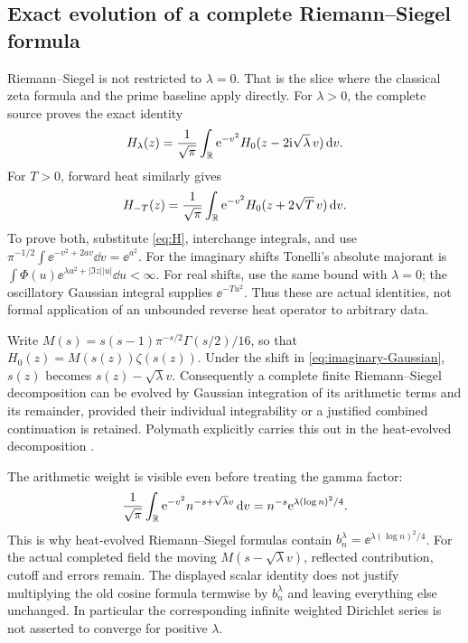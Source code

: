 \subsection{Exact evolution of a complete Riemann--Siegel formula}
Riemann--Siegel is not restricted to \(\lambda=0\). That is the slice
where the classical zeta formula and the prime baseline apply directly.
For \(\lambda>0\), the complete source proves the exact identity
\begin{equation}\label{eq:imaginary-Gaussian}
 H_\lambda(z)=\frac1{\sqrt\pi}\int_\mathbb R
       \mathrm e^{-v^2}H_0(z-2\mathrm i\sqrt\lambda\,v)\,\mathrm d v.
\end{equation}
For \(T>0\), forward heat similarly gives
\begin{equation}\label{eq:real-Gaussian}
 H_{-T}(z)=\frac1{\sqrt\pi}\int_\mathbb R
       \mathrm e^{-v^2}H_0(z+2\sqrt T\,v)\,\mathrm d v.
\end{equation}
To prove both, substitute \eqref{eq:H}, interchange integrals, and use
\(\pi^{-1/2}\int\ee^{-v^2+2av}\dd v=\ee^{a^2}\).
For the imaginary shifts Tonelli's absolute majorant is
\(\int\Phi(u)\ee^{\lambda u^2+|\Im z||u|}\dd u<\infty\).
For real shifts, use the same bound with \(\lambda=0\); the oscillatory
Gaussian integral supplies \(\ee^{-Tu^2}\). Thus these are actual
identities, not formal application of an unbounded reverse heat
operator to arbitrary data.

Write \(M(s)=s(s-1)\pi^{-s/2}\Gamma(s/2)/16\), so that
\(H_0(z)=M(s(z))\zeta(s(z))\). Under the shift in
\eqref{eq:imaginary-Gaussian}, \(s(z)\) becomes \(s(z)-\sqrt\lambda v\).
Consequently a complete finite Riemann--Siegel decomposition can be
evolved by Gaussian integration of its arithmetic terms and its
remainder, provided their individual integrability or a justified
combined continuation is retained. Polymath explicitly carries this
out in the heat-evolved decomposition
\cite[Section 4, equations (35)--(41)]{polymath2019heat}.

The arithmetic weight is visible even before treating the gamma factor:
\begin{equation}\label{eq:heat-Dirichlet-weight}
 \frac1{\sqrt\pi}\int_\mathbb R\mathrm e^{-v^2}
       n^{-s+\sqrt\lambda v}\,\mathrm d v
 =n^{-s}\mathrm e^{\lambda(\log n)^2/4}.
\end{equation}
This is why heat-evolved Riemann--Siegel formulas contain
\(b_n^\lambda=\ee^{\lambda(\log n)^2/4}\). For the actual completed
field the moving \(M(s-\sqrt\lambda v)\), reflected contribution,
cutoff and errors remain. The displayed scalar identity does not
justify multiplying the old cosine formula termwise by \(b_n^\lambda\)
and leaving everything else unchanged. In particular the corresponding
infinite weighted Dirichlet series is not asserted to converge for
positive \(\lambda\).


